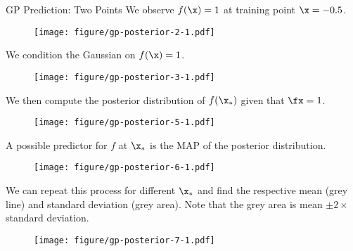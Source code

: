 \begin{frame}[c,allowframebreaks]{GP Prediction: Two Points}
We observe $f(\x) = 1$ at training point $\x = -0.5$. 


\begin{figure}
\texttt{[image: figure/gp-posterior-2-1.pdf]}\par
\end{figure}


\framebreak

We condition the Gaussian on $f(\x) = 1$. 


\begin{figure}
\texttt{[image: figure/gp-posterior-3-1.pdf]}\par
\end{figure}

\framebreak

We then compute the posterior distribution of $f(\x_*)$ given that $\fx = 1$.


\begin{figure}
\texttt{[image: figure/gp-posterior-5-1.pdf]}\par
\end{figure}


\framebreak

A possible predictor for $f$ at $\x_*$ is the MAP of the posterior distribution.


\begin{figure}
\texttt{[image: figure/gp-posterior-6-1.pdf]}\par
\end{figure}


\framebreak

We can repeat this process for different $\x_*$ and find the respective mean (grey line) and standard deviation (grey area). Note that the grey area is mean $\pm 2 \times$ standard deviation.


\begin{figure}
\texttt{[image: figure/gp-posterior-7-1.pdf]}\par
\end{figure}


\end{frame}
